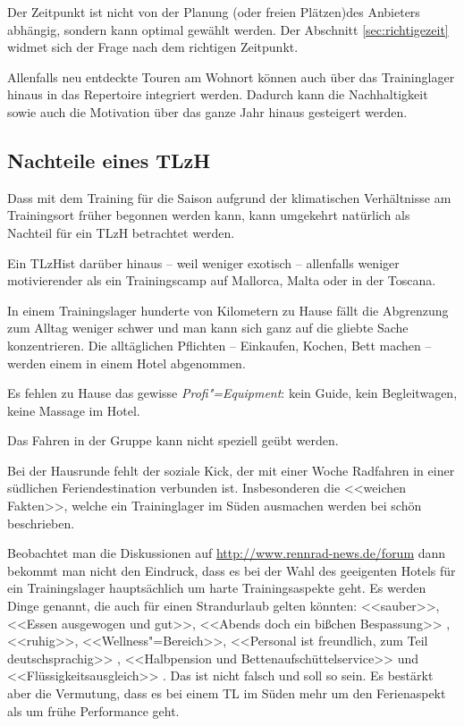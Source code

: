 \documentclass[a4paper,DIV13,BCOR0cm,draft=TRUE]{scrartcl}
\newcommand{\tlzh}{TLzH}
\begin{document}
Der Zeitpunkt ist nicht von der Planung (oder freien Plätzen)des Anbieters abhängig, sondern kann optimal gewählt werden.
Der Abschnitt \ref{sec:richtigezeit} widmet sich der Frage nach dem richtigen Zeitpunkt.

Allenfalls neu entdeckte Touren am Wohnort können auch über das Traininglager hinaus in das Repertoire integriert werden.
Dadurch kann die Nachhaltigkeit sowie auch die Motivation über das ganze Jahr hinaus gesteigert werden.

\subsection{Nachteile eines \tlzh}

Dass mit dem Training für die Saison aufgrund der klimatischen Verhältnisse am Trainingsort früher begonnen werden kann,
kann umgekehrt natürlich als Nachteil für ein \tlzh{} betrachtet werden.

Ein \tlzh ist darüber hinaus -- weil weniger exotisch -- allenfalls weniger motivierender als ein Trainingscamp auf Mallorca, Malta oder in der Toscana.

In einem Trainingslager hunderte von Kilometern zu Hause fällt die Abgrenzung zum Alltag weniger schwer und
man kann sich ganz auf die gliebte Sache konzentrieren.
Die alltäglichen Pflichten -- Einkaufen, Kochen, Bett machen -- werden einem in einem Hotel abgenommen.

Es fehlen zu Hause das gewisse \emph{Profi"=Equipment}: kein Guide, kein Begleitwagen, keine Massage im Hotel.

Das Fahren in der Gruppe kann nicht speziell geübt werden.

Bei der Hausrunde fehlt der soziale Kick, der mit einer Woche Radfahren in einer südlichen Feriendestination verbunden ist.
Insbesonderen die <<weichen Fakten>>, welche ein Traininglager im Süden ausmachen werden bei 
schön beschrieben.

Beobachtet man die Diskussionen auf \url{http://www.rennrad-news.de/forum} dann bekommt man nicht den Eindruck,
dass es bei der Wahl des geeigenten Hotels für ein Trainingslager hauptsächlich um harte Trainingsaspekte geht.
Es werden Dinge genannt, die auch für einen Strandurlaub gelten könnten:
<<sauber>>, <<Essen ausgewogen und gut>>, <<Abends doch ein bißchen Bespassung>> \cite{tka19762010hotel},
<<ruhig>>, <<Wellness"=Bereich>>, <<Personal ist freundlich, zum Teil deutschsprachig>> \cite{garfield22011hotel},
<<Halbpension und Bettenaufschüttelservice>> und <<Flüssigkeitsausgleich>> \cite{orteb2011hotel}.
Das ist nicht falsch und soll so sein. Es bestärkt aber die Vermutung, dass es bei einem TL im Süden mehr 
um den Ferienaspekt als um frühe Performance geht.
\end{document}
